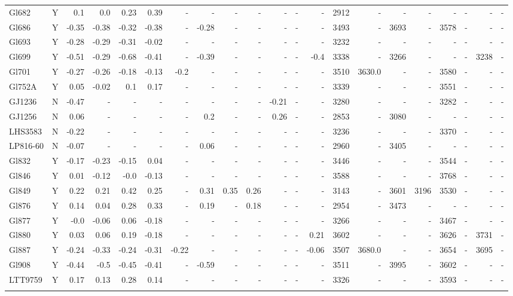 \documentclass[referee]{aa}
\begin{document}
{\begin{landscape}
{\begin{longtable}{l c r r r r r r r r r r r | r r r r r r r r }
Gl682 & Y & 0.1 & 0.0 & 0.23 & 0.39 & - & - & - & - & - & - & - & 2912 & - & - & - & - & - & - & - \\
Gl686 & Y & -0.35 & -0.38 & -0.32 & -0.38 & - & -0.28 & - & - & - & - & - & 3493 & - & 3693 & - & 3578 & - & - & - \\
Gl693 & Y & -0.28 & -0.29 & -0.31 & -0.02 & - & - & - & - & - & - & - & 3232 & - & - & - & - & - & - & - \\
Gl699 & Y & -0.51 & -0.29 & -0.68 & -0.41 & - & -0.39 & - & - & - & - & -0.4 & 3338 & - & 3266 & - & - & - & 3238 & - \\
Gl701 & Y & -0.27 & -0.26 & -0.18 & -0.13 & -0.2 & - & - & - & - & - & - & 3510 & 3630.0 & - & - & 3580 & - & - & - \\
Gl752A & Y & 0.05 & -0.02 & 0.1 & 0.17 & - & - & - & - & - & - & - & 3339 & - & - & - & 3551 & - & - & - \\
GJ1236 & N & -0.47 & - & - & - & - & - & - & - & -0.21 & - & - & 3280 & - & - & - & 3282 & - & - & - \\
GJ1256 & N & 0.06 & - & - & - & - & 0.2 & - & - & 0.26 & - & - & 2853 & - & 3080 & - & - & - & - & - \\
LHS3583 & N & -0.22 & - & - & - & - & - & - & - & - & - & - & 3236 & - & - & - & 3370 & - & - & - \\
LP816-60 & N & -0.07 & - & - & - & - & 0.06 & - & - & - & - & - & 2960 & - & 3405 & - & - & - & - & - \\
Gl832 & Y & -0.17 & -0.23 & -0.15 & 0.04 & - & - & - & - & - & - & - & 3446 & - & - & - & 3544 & - & - & - \\
Gl846 & Y & 0.01 & -0.12 & -0.0 & -0.13 & - & - & - & - & - & - & - & 3588 & - & - & - & 3768 & - & - & - \\
Gl849 & Y & 0.22 & 0.21 & 0.42 & 0.25 & - & 0.31 & 0.35 & 0.26 & - & - & - & 3143 & - & 3601 & 3196 & 3530 & - & - & - \\
Gl876 & Y & 0.14 & 0.04 & 0.28 & 0.33 & - & 0.19 & - & 0.18 & - & - & - & 2954 & - & 3473 & - & - & - & - & - \\
Gl877 & Y & -0.0 & -0.06 & 0.06 & -0.18 & - & - & - & - & - & - & - & 3266 & - & - & - & 3467 & - & - & - \\
Gl880 & Y & 0.03 & 0.06 & 0.19 & -0.18 & - & - & - & - & - & - & 0.21 & 3602 & - & - & - & 3626 & - & 3731 & - \\
Gl887 & Y & -0.24 & -0.33 & -0.24 & -0.31 & -0.22 & - & - & - & - & - & -0.06 & 3507 & 3680.0 & - & - & 3654 & - & 3695 & - \\
Gl908 & Y & -0.44 & -0.5 & -0.45 & -0.41 & - & -0.59 & - & - & - & - & - & 3511 & - & 3995 & - & 3602 & - & - & - \\
LTT9759 & Y & 0.17 & 0.13 & 0.28 & 0.14 & - & - & - & - & - & - & - & 3326 & - & - & - & 3593 & - & - & - \\
\label{table:compfull}
\end{longtable}}
\end{landscape}
}
\end{document}
